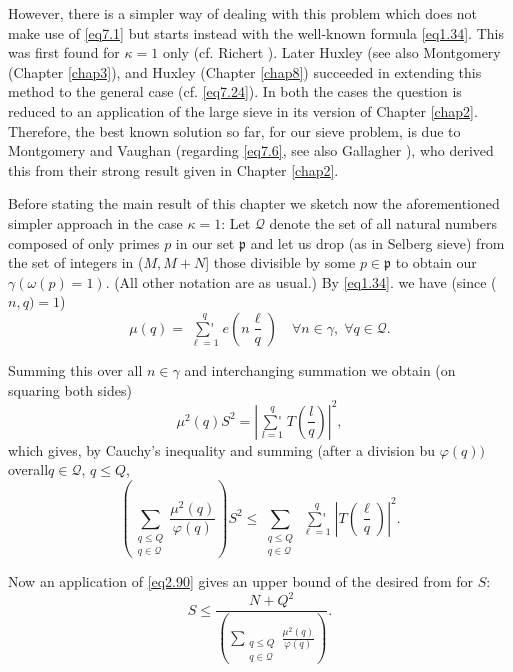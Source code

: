 However, there is a simpler way of dealing with this problem which
does not make use of \eqref{eq7.1} but starts instead with the well-known
formula \eqref{eq1.34}. This was first found for $\kappa = 1$ only
(cf. Richert \cite{key2}). Later Huxley \cite{key5} 
(see also Montgomery \cite{key5} (Chapter \ref{chap3}),
and Huxley \cite{key7} (Chapter \ref{chap8}) 
succeeded  in extending this method to
the general case (cf. \eqref{eq7.24}). In both the cases the question is
reduced to an application of the large sieve in its version of
Chapter \ref{chap2}. Therefore, the best known solution so far, for our sieve
problem, is due to Montgomery and Vaughan \cite{key2} (regarding
\eqref{eq7.6}, see also Gallagher \cite{key6}), 
who derived this from their strong result given in Chapter \ref{chap2}. 

Before stating the main result of this chapter we sketch now the
aforementioned simpler approach in the case $\kappa=1$: Let
$\mathscr{Q}$ denote the
set of all natural numbers composed of only primes $p$ in our set
$\mathfrak{p}$ and let us drop (as in Selberg sieve) from the set of integers in
($M,M+N$] those divisible by some $p \in \mathfrak{p}$ to obtain our
  $\gamma(\omega(p)=1)$. (All other notation are as usual.) By
  \eqref{eq1.34}. we have (since ($n,q)=1$) 
\begin{equation}
\mu(q) = \mathop{\sum{}'}\limits^{q}_{\ell=1} e(n \frac{\ell}{q})\quad
\forall n \in \gamma, \; \forall q \in \mathscr{Q}. \tag{7.2}\label{eq7.2} 
\end{equation}

Summing this over all $n \in \gamma$ and interchanging summation
we obtain (on squaring both sides) 
\begin{equation*}
\mu^2 (q) S^2 =| \mathop{\sum{}'}\limits^{q}_{l=1}T(\frac{l}{q})|^2,
\tag{7.3}\label{eq7.3} 
\end{equation*}
which gives, by Cauchy's inequality and summing (after a division bu
$\varphi(q))$ overall\pageoriginale  $q \in \mathscr{Q}$, $q\leq Q$, 
\begin{equation}
(\sum_ {\substack{q \leq Q \\ {q \in \mathscr{Q}}}}
  \frac{\mu^2(q)}{\varphi(q)})S^2 \le \sum_ {\substack{q \le Q \\ {q
        \in \mathscr{Q}}}}
       \mathop{\sum{}'}\limits^{q}_{\ell=1}|T(\frac{\ell}{q})|^2.
 \tag{7.4}\label{eq7.4}   
\end{equation}

Now an application of \eqref{eq2.90} gives an upper bound of the
desired from for $S$: 
\begin{equation}
S \leq \frac{N+Q^2}{(\sum _{\substack {q \leq Q \\ q \in \mathscr{Q}}}
  \frac{\mu^2(q)}{\varphi(q)})}. \tag{7.5}\label{eq7.5} 
\end{equation}

